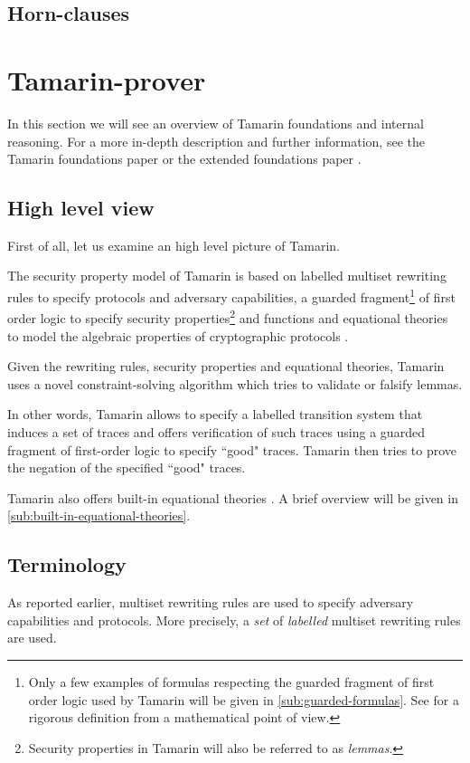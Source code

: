 \subsection{Horn-clauses}







\section{Tamarin-prover}
In this section we will see an overview of Tamarin foundations and internal reasoning.
For a more in-depth description and further information, see the Tamarin foundations paper \cite{TamarinFoundations} or the extended foundations paper \cite{TamarinFoundationsExtended}.

\subsection{High level view}
First of all, let us examine an high level picture of Tamarin.

The security property model of Tamarin is based on labelled multiset rewriting rules to specify protocols and adversary capabilities, a guarded fragment\footnote{Only a few examples of formulas respecting the guarded fragment of first order logic used by Tamarin will be given in \cref{sub:guarded-formulas}. See \cite{FragmentFirstOrderLogicPaper} for a rigorous definition from a mathematical point of view.} of first order logic to specify security properties\footnote{Security properties in Tamarin will also be referred to as \textit{lemmas}.} and functions and equational theories to model the algebraic properties of cryptographic protocols \cite{TamarinFoundations}.

Given the rewriting rules, security properties and equational theories, Tamarin uses a novel constraint-solving algorithm which tries to validate or falsify lemmas.

In other words, Tamarin allows to specify a labelled transition system that induces a set of traces and offers verification of such traces using a guarded fragment of first-order logic to specify ``good" traces. Tamarin then tries to prove the negation of the specified ``good" traces.

Tamarin also offers built-in equational theories \cite{TamarinProverManual}. A brief overview will be given in \cref{sub:built-in-equational-theories}.

\subsection{Terminology}
As reported earlier, multiset rewriting rules are used to specify adversary capabilities and protocols. More precisely, a \textit{set} of \textit{labelled} multiset rewriting rules are used.

